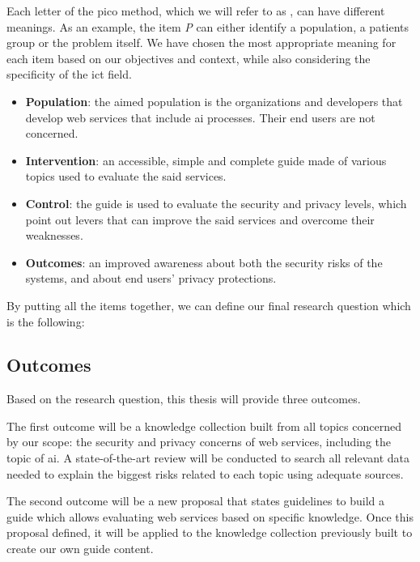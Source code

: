Each letter of the \gls{pico} method, which we will refer to as , can have different meanings. As an example, the item \textit{P} can either identify a population, a patients group or the problem itself. We have chosen the most appropriate meaning for each item based on our objectives and context, while also considering the specificity of the \gls{ict} field.
\begin{itemize}
    \item \textbf{Population}: the aimed population is the organizations and developers that develop web services that include \gls{ai} processes. Their end users are not concerned. 
    \item \textbf{Intervention}: an accessible, simple and complete guide made of various topics used to evaluate the said services.
    \item \textbf{Control}: the guide is used to evaluate the security and privacy levels, which point out levers that can improve the said services and overcome their weaknesses.
    \item \textbf{Outcomes}: an improved awareness about both the security risks of the systems, and about end users' privacy protections.
\end{itemize}

By putting all the items together, we can define our final research question which is the following: 
\begin{displayquote}
	\Researchquestion
\end{displayquote}

\subsection{Outcomes}
\label{subsec:introduction_contribution_outcomes}

Based on the research question, this thesis will provide three outcomes.

The first outcome will be a knowledge collection built from all topics concerned by our scope: the security and privacy concerns of web services, including the topic of \gls{ai}. A state-of-the-art review will be conducted to search all relevant data needed to explain the biggest risks related to each topic using adequate sources.

The second outcome will be a new proposal that states guidelines to build a guide which allows evaluating web services based on specific knowledge. Once this proposal defined, it will be applied to the knowledge collection previously built to create our own guide content.

